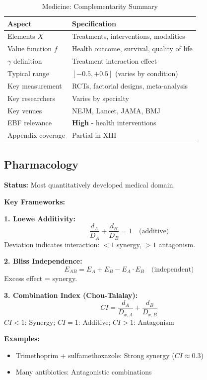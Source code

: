 \begin{table}[h]
\centering
\caption{Medicine: Complementarity Summary}
\label{tab:med-summary}
\renewcommand{\arraystretch}{1.3}
\small
\begin{tabular}{@{}ll@{}}
\toprule
\textbf{Aspect} & \textbf{Specification} \\
\midrule
Elements $X$ & Treatments, interventions, modalities \\
Value function $f$ & Health outcome, survival, quality of life \\
$\gamma$ definition & Treatment interaction effect \\
Typical range & $[-0.5, +0.5]$ (varies by condition) \\
Key measurement & RCTs, factorial designs, meta-analysis \\
Key researchers & Varies by specialty \\
Key venues & NEJM, Lancet, JAMA, BMJ \\
EBF relevance & \textbf{High} - health interventions \\
Appendix coverage & Partial in XIII \\
\bottomrule
\end{tabular}
\end{table}

\subsection{Pharmacology}
\label{sec:pharma}

\begin{tcolorbox}[colback=orange!5!white,colframe=orange!75!black,title=\textbf{Pharmacology: Drug-Drug Interactions}]

\textbf{Status:} Most quantitatively developed medical domain.

\textbf{Key Frameworks:}

\textbf{1. Loewe Additivity:}
\begin{equation}
\frac{d_A}{D_A} + \frac{d_B}{D_B} = 1 \quad \text{(additive)}
\end{equation}
Deviation indicates interaction: $<1$ synergy, $>1$ antagonism.

\textbf{2. Bliss Independence:}
\begin{equation}
E_{AB} = E_A + E_B - E_A \cdot E_B \quad \text{(independent)}
\end{equation}
Excess effect = synergy.

\textbf{3. Combination Index (Chou-Talalay):}
\begin{equation}
CI = \frac{d_A}{D_{x,A}} + \frac{d_B}{D_{x,B}}
\end{equation}
$CI < 1$: Synergy; $CI = 1$: Additive; $CI > 1$: Antagonism

\textbf{Examples:}
\begin{itemize}[noitemsep]
    \item Trimethoprim + sulfamethoxazole: Strong synergy ($CI \approx 0.3$)
    \item Many antibiotics: Antagonistic combinations
\end{itemize}

\end{tcolorbox}

